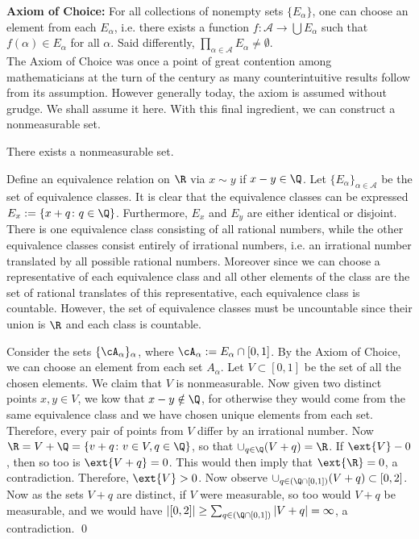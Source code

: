 \noindent \textbf{Axiom of Choice:} For all collections of nonempty sets $\{E_\alpha\}$, one can choose an element from each $E_\alpha$, i.e. there exists a function $f: \mathcal{A} \to \bigcup E_\alpha$ such that $f(\alpha) \in E_\alpha$ for all $\alpha$. Said differently, $\prod_{\alpha \in \mathcal{A}} E_\alpha \neq \emptyset$. \\


The Axiom of Choice was once a point of great contention among mathematicians at the turn of the century as many counterintuitive results follow from its assumption. However generally today, the axiom is assumed without grudge. We shall assume it here. With this final ingredient, we can construct a nonmeasurable set. 


\begin{thm}
There exists a nonmeasurable set. 
\end{thm}

\pf Define an equivalence relation on $\R$ via $x \sim y$ if $x-y \in \Q$. Let $\{E_\alpha\}_{\alpha \in \mathcal{A}}$ be the set of equivalence classes. It is clear that the equivalence classes can be expressed $E_x:= \{ x+q \colon q \in \Q\}$. Furthermore, $E_x$ and $E_y$ are either identical or disjoint. There is one equivalence class consisting of all rational numbers, while the other equivalence classes consist entirely of irrational numbers, i.e. an irrational number translated by all possible rational numbers. Moreover since we can choose a representative of each equivalence class and all other elements of the class are the set of rational translates of this representative, each equivalence class is countable. However, the set of equivalence classes must be uncountable since their union is $\R$ and each class is countable. 

Consider the sets $\{ \cA_\alpha \}_{\alpha}$, where $\cA_\alpha:=E_\alpha \cap [0,1]$. By the Axiom of Choice, we can choose an element from each set $A_\alpha$. Let $V \subset [0,1]$ be the set of all the chosen elements. We claim that $V$ is nonmeasurable. Now given two distinct points $x,y \in V$, we kow that $x-y \notin \Q$, for otherwise they would come from the same equivalence class and we have chosen unique elements from each set. Therefore, every pair of points from $V$ differ by an irrational number. Now $\R=V+\Q=\{ v+q \colon v \in V, q \in \Q\}$, so that $\cup_{q \in \Q} (V+q)= \R$. If $\ext{V}-0$, then so too is $\ext{V+q}=0$. This would then imply that $\ext{\R}=0$, a contradiction. Therefore, $\ext{V}>0$. Now observe $\cup_{q \in (\Q \cap [0,1])} (V+q) \subset [0,2]$. Now as the sets $V+q$ are distinct, if $V$ were measurable, so too would $V+q$ be measurable, and we would have $|[0,2]| \geq \sum_{q \in (\Q \cap [0,1])} |V+q|= \infty$, a contradiction. \qed \\


